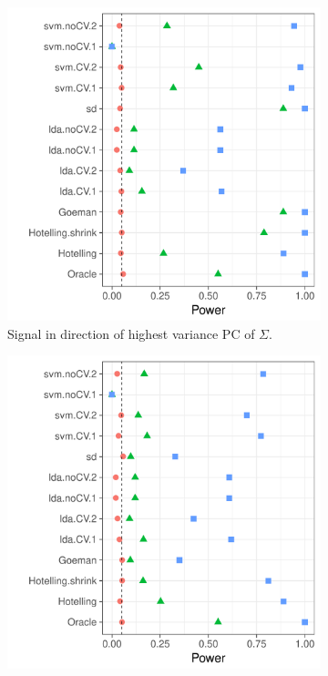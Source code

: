 \documentclass[12pt,a4paper]{article}
\begin{document}
\begin{figure}[h]
	\centering
	\caption{Short memory, AR(1) correlation. 
	$\Sigma_{k,l}=\rho^{|k-l|}; \rho=0.6$}	
	\label{fig:dependence_1}
	\begin{subfigure}[t]{.4\textwidth}
	\centering
	\includegraphics[width=1\linewidth]{"art/file20"}
	\caption{Signal in direction of highest variance PC of $\Sigma$.} 
	\label{fig:dependence_11}
	\end{subfigure}
	\begin{subfigure}[t]{.4\textwidth}
		\centering
		\includegraphics[width=1\linewidth]{"art/file21"}

\end{subfigure}
\end{figure}
\end{document}
